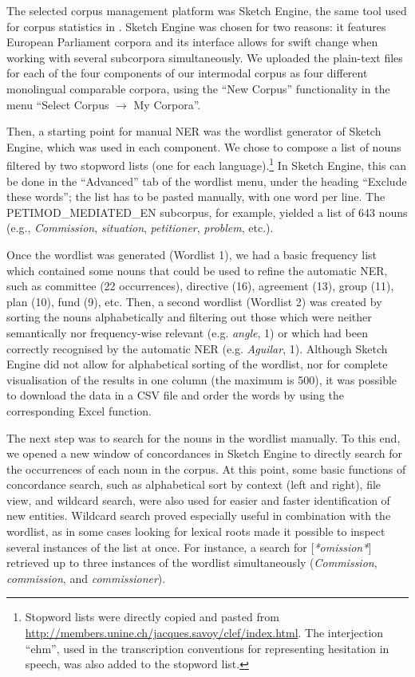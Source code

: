 \documentclass[output=paper]{langscibook}
\begin{document}
The selected corpus management platform was Sketch Engine, the same tool used for corpus statistics in . Sketch Engine was chosen for two reasons: it features European Parliament corpora \citep{Ustaszewski2019} and its interface allows for swift change when working with several subcorpora simultaneously. We uploaded the plain-text files for each of the four components of our intermodal corpus as four different monolingual comparable corpora, using the “New Corpus” functionality in the menu “Select Corpus $\rightarrow$ My Corpora”. 

Then, a starting point for manual NER was the wordlist generator of Sketch Engine, which was used in each component. We chose to compose a list of nouns filtered by two stopword lists (one for each language).\footnote{Stopword lists were directly copied and pasted from \url{http://members.unine.ch/jacques.savoy/clef/index.html}. The interjection “ehm”, used in the transcription conventions for representing hesitation in speech, was also added to the stopword list.} In Sketch Engine, this can be done in the “Advanced” tab of the wordlist menu, under the heading “Exclude these words”; the list has to be pasted manually, with one word per line. The PETIMOD\_MEDIATED\_EN subcorpus, for example, yielded a list of 643 nouns (e.g., \textit{Commission}, \textit{situation}, \textit{petitioner}, \textit{problem}, etc.).

Once the wordlist was generated (Wordlist 1), we had a basic frequency list which contained some nouns that could be used to refine the automatic NER, such as committee (22 occurrences), directive (16), agreement (13), group (11), plan (10), fund (9), etc. 
Then, a second wordlist (Wordlist 2) was created by sorting the nouns alphabetically and filtering out those which were neither semantically nor frequency-wise relevant (e.g. \textit{angle}, 1) or which had been correctly recognised by the automatic NER (e.g. \textit{Aguilar}, 1). Although Sketch Engine did not allow for alphabetical sorting of the wordlist, nor for complete visualisation of the results in one column (the maximum is 500), it was possible to download the data in a CSV file and order the words by using the corresponding Excel function.

The next step was to search for the nouns in the wordlist manually. To this end, we opened a new window of concordances in Sketch Engine to directly search for the occurrences of each noun in the corpus. At this point, some basic functions of concordance search, such as alphabetical sort by context (left and right), file view, and wildcard search, were also used for easier and faster identification of new entities. Wildcard search proved especially useful in combination with the wordlist, as in some cases looking for lexical roots made it possible to inspect several instances of the list at once. For instance, a search for [\textit{*omission*}] retrieved up to three instances of the wordlist simultaneously (\textit{Commission}, \textit{commission}, and \textit{commissioner}).
\end{document}
